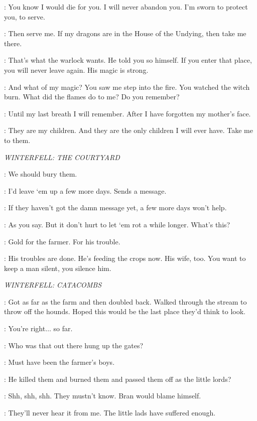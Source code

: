 \JORAH: You know I would die for you. I will never abandon you. I'm sworn to protect you, to serve. 

\DAENERYS: Then serve me. If my dragons are in the House of the Undying, then take me there. 

\JORAH: That's what the warlock wants. He told you so himself. If you enter that place, you will never leave again. His magic is strong. 

\DAENERYS: And what of my magic? You saw me step into the fire. You watched the witch burn. What did the flames do to me? Do you remember? 

\JORAH: Until my last breath I will remember. After I have forgotten my mother's face. 

\DAENERYS: They are my children. And they are the only children I will ever have. Take me to them. 

\scene

\textit{WINTERFELL: THE COURTYARD} 


\THEON: We should bury them. 

\DAGMER: I'd leave `em up a few more days. Sends a message. 

\THEON: If they haven't got the damn message yet, a few more days won't help. 

\DAGMER: As you say. But it don't hurt to let `em rot a while longer. What's this? 

\THEON: Gold for the farmer. For his trouble. 

\DAGMER: His troubles are done. He's feeding the crops now. His wife, too. You want to keep a man silent, you silence him. 



\scene

\textit{WINTERFELL: CATACOMBS} 


\OSHA: Got as far as the farm and then doubled back. Walked through the stream to throw off the hounds. Hoped this would be the last place they'd think to look. 

\LUWIN: You're right$\ldots$ so far. 

\OSHA: Who was that out there hung up the gates? 

\LUWIN: Must have been the farmer's boys. 

\OSHA: He killed them and burned them and passed them off as the little lords? 

\LUWIN: Shh, shh, shh. They mustn't know. Bran would blame himself. 

\OSHA: They'll never hear it from me. The little lads have suffered enough. 


